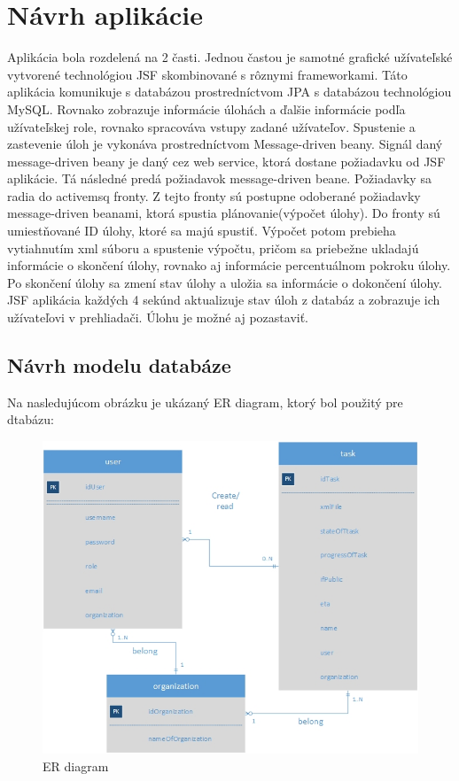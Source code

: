 \section{Návrh aplikácie}
Aplikácia bola rozdelená na 2 časti. Jednou častou je samotné grafické užívateľské vytvorené technológiou JSF skombinované s rôznymi frameworkami. Táto aplikácia komunikuje s databázou prostredníctvom JPA s databázou technológiou MySQL. Rovnako zobrazuje informácie úlohách a ďalšie informácie podľa užívateľskej role, rovnako spracováva vstupy zadané užívateľov. Spustenie a zastevenie úloh je vykonáva prostredníctvom Message-driven beany. Signál daný message-driven beany je daný cez web service, ktorá dostane požiadavku od JSF aplikácie. Tá následné predá požiadavok message-driven beane. Požiadavky sa radia do activemsq fronty. Z tejto fronty sú postupne odoberané požiadavky message-driven beanami, ktorá spustia plánovanie(výpočet úlohy). Do fronty sú umiestňované ID úlohy, ktoré sa majú spustiť. Výpočet potom prebieha vytiahnutím xml súboru a spustenie výpočtu, pričom sa priebežne ukladajú informácie o skončení úlohy, rovnako aj informácie percentuálnom pokroku úlohy. Po skončení úlohy sa zmení stav úlohy a uložia sa informácie o dokončení úlohy. JSF aplikácia každých 4 sekúnd aktualizuje stav úloh z databáz a zobrazuje ich užívateľovi v prehliadači. Úlohu je možné aj pozastaviť. 





\subsection{Návrh modelu databáze}
Na nasledujúcom obrázku je ukázaný ER diagram, ktorý bol použitý pre dtabázu:
\begin{figure}[htb]

\begin{center}

\includegraphics[scale=0.5]{ER.jpg} 
\caption{ER diagram}
\label{ER}

\end{center}

\end{figure}

